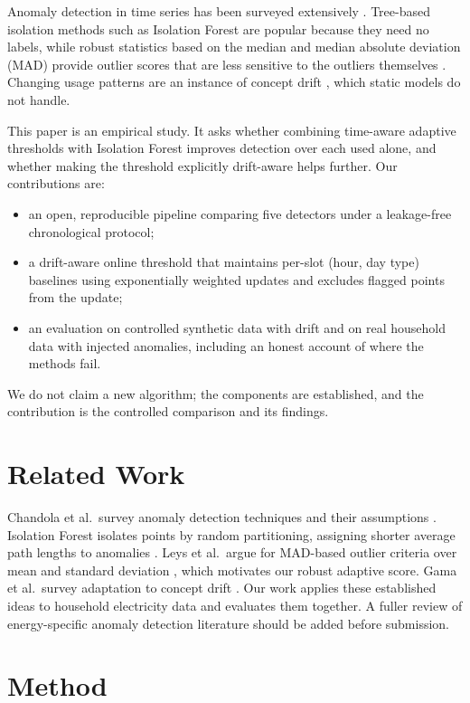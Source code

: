 \documentclass[conference]{IEEEtran}
\begin{document}
Anomaly detection in time series has been surveyed extensively \cite{chandola2009}. Tree-based isolation methods such as Isolation Forest \cite{liu2008} are popular because they need no labels, while robust statistics based on the median and median absolute deviation (MAD) provide outlier scores that are less sensitive to the outliers themselves \cite{leys2013}. Changing usage patterns are an instance of concept drift \cite{gama2014}, which static models do not handle.

This paper is an empirical study. It asks whether combining time-aware adaptive thresholds with Isolation Forest improves detection over each used alone, and whether making the threshold explicitly drift-aware helps further. Our contributions are:
\begin{itemize}
\item an open, reproducible pipeline comparing five detectors under a leakage-free chronological protocol;
\item a drift-aware online threshold that maintains per-slot (hour, day type) baselines using exponentially weighted updates and excludes flagged points from the update;
\item an evaluation on controlled synthetic data with drift and on real household data with injected anomalies, including an honest account of where the methods fail.
\end{itemize}
We do not claim a new algorithm; the components are established, and the contribution is the controlled comparison and its findings.

\section{Related Work}
Chandola et al.\ survey anomaly detection techniques and their assumptions \cite{chandola2009}. Isolation Forest isolates points by random partitioning, assigning shorter average path lengths to anomalies \cite{liu2008}. Leys et al.\ argue for MAD-based outlier criteria over mean and standard deviation \cite{leys2013}, which motivates our robust adaptive score. Gama et al.\ survey adaptation to concept drift \cite{gama2014}. Our work applies these established ideas to household electricity data and evaluates them together. A fuller review of energy-specific anomaly detection literature should be added before submission.

\section{Method}
\end{document}
